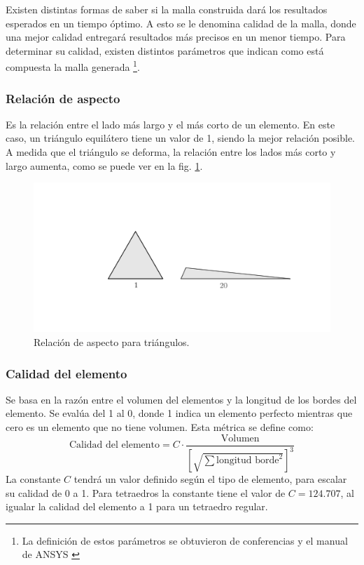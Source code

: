 Existen distintas formas de saber si la malla construida dará los resultados esperados en un tiempo óptimo. A esto se le denomina calidad de la malla, donde una mejor calidad entregará resultados más precisos en un menor tiempo. Para determinar su calidad, existen distintos parámetros que indican como está compuesta la malla generada \footnote{La definición de estos parámetros se obtuvieron de conferencias y el manual de ANSYS \cite{sharcnet_2017}\cite{ansys_2015}}.

\subsubsection{Relación de aspecto}
Es la relación entre el lado más largo y el más corto de un elemento. En este caso, un triángulo equilátero tiene un valor de 1, siendo la mejor relación posible. A medida que el triángulo se deforma, la relación entre los lados más corto y largo aumenta, como se puede ver en la fig. \ref{fig:asp_ratio}.

\begin{figure}[h]
\centering
\includegraphics[width=0.5\linewidth, trim={12cm 7cm 6.5cm 7.5cm}, clip]{Imagenes/asp_ratio.pdf}
\caption{Relación de aspecto para triángulos.}
\label{fig:asp_ratio}
\end{figure}

\subsubsection{Calidad del elemento}
Se basa en la razón entre el volumen del elementos y la longitud de los bordes del elemento. Se evalúa del 1 al 0, donde 1 indica un elemento perfecto mientras que cero es un elemento que no tiene volumen. Esta métrica se define como:
\begin{equation}
	\text{Calidad del elemento} = C \cdot \frac{\text{Volumen}}{\left[\sqrt{\sum \text{longitud borde}^2}\right]^3}
\end{equation}
La constante $C$ tendrá un valor definido según el tipo de elemento, para escalar su calidad de 0 a 1. Para tetraedros la constante tiene el valor de $C=124.707$, al igualar la calidad del elemento a 1 para un tetraedro regular.


